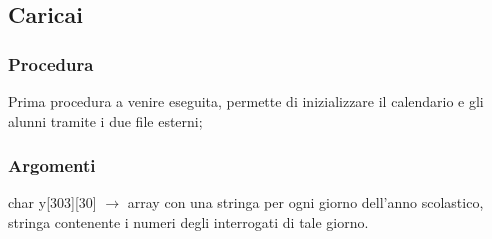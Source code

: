 \documentclass[14pt]{extarticle}
\begin{document}
\subsection{Caricai}
\subsubsection*{Procedura}
Prima procedura a venire eseguita, permette di inizializzare il calendario e gli alunni tramite i due file esterni;
\subsubsection*{Argomenti}
char y[303][30] $\longrightarrow$ array con una stringa per ogni giorno dell'anno scolastico, stringa contenente i numeri degli interrogati di tale giorno.
\vspace{50px}
\end{document}
